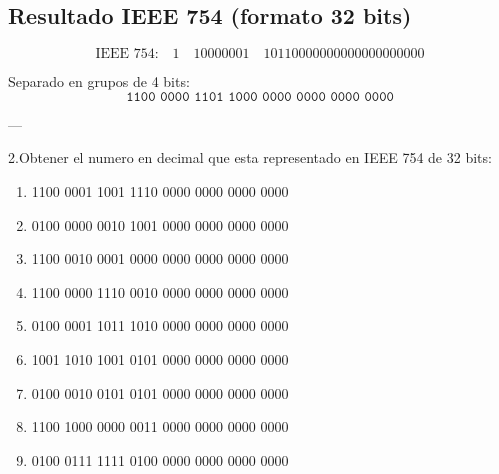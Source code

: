 \documentclass[a4paper,12pt]{article}
\begin{document}
\begin{center}
		\subsection*{Resultado IEEE 754 (formato 32 bits)}
		
		\[
		\text{IEEE 754:} \quad 
		\boxed{1} \quad \boxed{10000001} \quad \boxed{10110000000000000000000}
		\]
		
		Separado en grupos de 4 bits:
		\vspace{-0.5em}
		\[
		\texttt{1100\ 0000\ 1101\ 1000\ 0000\ 0000\ 0000\ 0000}
		\]

		---	
	\end{center}

	2.Obtener el numero en decimal que esta representado en IEEE 754 de 32 bits:
	\begin{enumerate}
		\item 1100 0001 1001 1110 0000 0000 0000 0000
		\item 0100 0000 0010 1001 0000 0000 0000 0000
		\item 1100 0010 0001 0000 0000 0000 0000 0000
		\item 1100 0000 1110 0010 0000 0000 0000 0000
		\item 0100 0001 1011 1010 0000 0000 0000 0000
		\item 1001 1010 1001 0101 0000 0000 0000 0000
		\item 0100 0010 0101 0101 0000 0000 0000 0000
		\item 1100 1000 0000 0011 0000 0000 0000 0000
		\item 0100 0111 1111 0100 0000 0000 0000 0000
	\end{enumerate}
	\vspace{1em}
\end{document}
